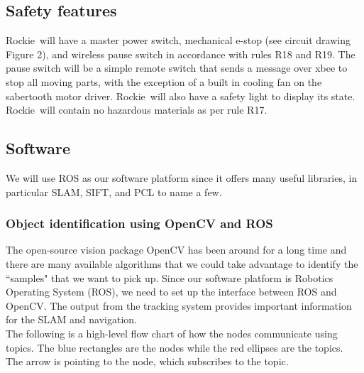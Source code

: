 \documentclass{paper}
\newcommand \robotName{Rockie} 		%
\begin{document}
\subsection*{Safety features}

	\robotName \ will have a master power switch, mechanical e-stop (see circuit drawing Figure 2), and wireless pause switch in accordance with rules R18 and R19.  The pause switch will be a simple remote switch that sends a message over xbee to stop all moving parts, with the exception of a built in cooling fan on the sabertooth motor driver.  \robotName \ will also have a safety light to display its state.  
	\robotName \ will contain no hazardous materials as per rule R17.  



\subsection*{Software}

	We will use ROS as our software platform since it offers many useful libraries, in particular SLAM, SIFT, and PCL to name a few.     

\subsubsection*{Object identification using OpenCV and ROS}
The open-source vision package OpenCV has been around for a long time and there are many available algorithms that we could take advantage to identify the ``samples" that we want to pick up. Since  our software platform is Robotics Operating System (ROS), we need to set up the interface between ROS and OpenCV. The output from the tracking system provides important information for the SLAM and navigation. \\ 

The following is a high-level flow chart of how the nodes communicate using topics. The blue rectangles are the nodes while the red ellipses are the topics. The arrow is pointing to the node, which subscribes to the topic. 
\end{document}
